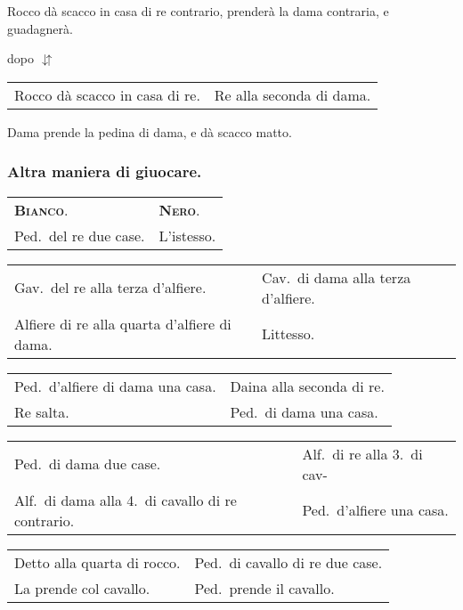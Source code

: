 \documentclass[11pt,a6paper]{article}
\newcommand{\markerD}{{\small$\downuparrows$}}
\begin{document}
Rocco dà scacco in casa di re contrario, prenderà
la dama contraria, e guadagnerà.

dopo \markerD

{\small\noindent\begin{tabular}{@{}p{3.84cm}p{3.84cm}}
Rocco dà scacco in casa di re. & Re alla seconda di dama.\\
\end{tabular}}

Dama prende la pedina di dama, e dà scacco matto.

\subsubsection{Altra maniera di giuocare.}

{\small\noindent\begin{tabular}{@{}p{3.84cm}p{3.84cm}}
{\bfseries\scshape Bianco}.&{\bfseries\scshape Nero}.\\
Ped.\ del re due case.&L'istesso.\\
\end{tabular}

\noindent\begin{tabular}{@{}p{3.84cm}p{3.84cm}}
Gav.\ del re alla terza d'alfiere.&Cav.\ di dama alla terza d'alfiere.\\
Alfiere di re alla quarta d'alfiere di dama.&Littesso.\\
\end{tabular}

\noindent\begin{tabular}{@{}p{3.84cm}p{3.84cm}}
Ped.\ d'alfiere di dama una casa. &Daina alla seconda di re.\\
Re salta. &Ped.\ di dama una casa.\\
\end{tabular}

\noindent\begin{tabular}{@{}p{3.84cm}p{3.84cm}}
Ped.\ di dama due case. &Alf.\ di re alla 3.\ di cav-\\
Alf.\ di dama alla 4.\ di cavallo di re contrario.&Ped.\ d'alfiere una casa.\\
\end{tabular}

\noindent\begin{tabular}{@{}p{3.84cm}p{3.84cm}}
Detto alla quarta di rocco. &Ped.\ di cavallo di re due case.\\
La prende col cavallo. &Ped.\ prende il cavallo.\\
\end{tabular}

}
\end{document}
